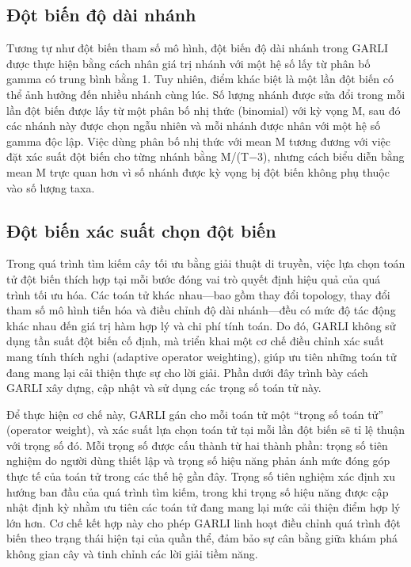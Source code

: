 \documentclass[12pt,a4paper]{report}
\begin{document}
\subsection{Đột biến độ dài nhánh}

Tương tự như đột biến tham số mô hình, đột biến độ dài nhánh trong GARLI được thực hiện bằng cách nhân giá trị nhánh với một hệ số lấy từ phân bố gamma có trung bình bằng 1. Tuy nhiên, điểm khác biệt là một lần đột biến có thể ảnh hưởng đến nhiều nhánh cùng lúc. Số lượng nhánh được sửa đổi trong mỗi lần đột biến được lấy từ một phân bố nhị thức (binomial) với kỳ vọng M, sau đó các nhánh này được chọn ngẫu nhiên và mỗi nhánh được nhân với một hệ số gamma độc lập. Việc dùng phân bố nhị thức với mean M tương đương với việc đặt xác suất đột biến cho từng nhánh bằng M/(T−3), nhưng cách biểu diễn bằng mean M trực quan hơn vì số nhánh được kỳ vọng bị đột biến không phụ thuộc vào số lượng taxa.

\subsection{Đột biến xác suất chọn đột biến}

Trong quá trình tìm kiếm cây tối ưu bằng giải thuật di truyền, việc lựa chọn toán tử đột biến thích hợp tại mỗi bước đóng vai trò quyết định hiệu quả của quá trình tối ưu hóa. Các toán tử khác nhau—bao gồm thay đổi topology, thay đổi tham số mô hình tiến hóa và điều chỉnh độ dài nhánh—đều có mức độ tác động khác nhau đến giá trị hàm hợp lý và chi phí tính toán. Do đó, GARLI không sử dụng tần suất đột biến cố định, mà triển khai một cơ chế điều chỉnh xác suất mang tính thích nghi (adaptive operator weighting), giúp ưu tiên những toán tử đang mang lại cải thiện thực sự cho lời giải. Phần dưới đây trình bày cách GARLI xây dựng, cập nhật và sử dụng các trọng số toán tử này. 

Để thực hiện cơ chế này, GARLI gán cho mỗi toán tử một “trọng số toán tử” (operator weight), và xác suất lựa chọn toán tử tại mỗi lần đột biến sẽ tỉ lệ thuận với trọng số đó. Mỗi trọng số được cấu thành từ hai thành phần: trọng số tiên nghiệm do người dùng thiết lập và trọng số hiệu năng phản ánh mức đóng góp thực tế của toán tử trong các thế hệ gần đây. Trọng số tiên nghiệm xác định xu hướng ban đầu của quá trình tìm kiếm, trong khi trọng số hiệu năng được cập nhật định kỳ nhằm ưu tiên các toán tử đang mang lại mức cải thiện điểm hợp lý lớn hơn. Cơ chế kết hợp này cho phép GARLI linh hoạt điều chỉnh quá trình đột biến theo trạng thái hiện tại của quần thể, đảm bảo sự cân bằng giữa khám phá không gian cây và tinh chỉnh các lời giải tiềm năng.
\end{document}
